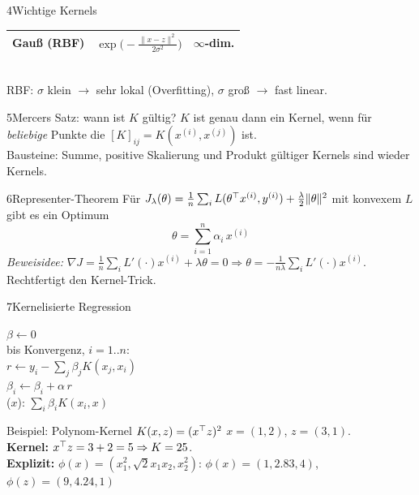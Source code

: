 \begin{hngrid}
\begin{hnp}[raster multicolumn=3,acc=hnnavy]{4}{Wichtige Kernels}
\begin{tabular}{@{}p{2.0cm}p{3.9cm}p{2.5cm}@{}}
Gauß (RBF)&$\exp\!\bigl(-\frac{\|x-z\|^2}{2\sigma^2}\bigr)$&$\infty$-dim.\\\hline
\end{tabular}
\\[2pt]
RBF: $\sigma$ klein $\to$ sehr lokal (Overfitting), $\sigma$ groß $\to$ fast linear.
\end{hnp}
%
\begin{hnp}[raster multicolumn=3,acc=hngreen]{5}{Mercers Satz: wann ist $K$ gültig?}
$K$ ist genau dann ein Kernel, wenn für \emph{beliebige} Punkte die  $[K]_{ij}=K(x^{(i)},x^{(j)})$  ist.\\
Bausteine: Summe, positive Skalierung und Produkt gültiger Kernels sind wieder Kernels.
\end{hnp}
%
\begin{hnp}[raster multicolumn=3,acc=hnrose]{6}{Representer-Theorem}
Für $J_\lambda(\theta)=\frac1n\sum_iL(\theta^{\top} x^{(i)},y^{(i)})+\frac\lambda2\|\theta\|^2$ mit konvexem $L$ gibt es ein Optimum
\[ \theta=\sum_{i=1}^{n}\alpha_i\,x^{(i)} \]
\emph{Beweisidee:} $\nabla J=\frac1n\sum_iL'(\cdot)x^{(i)}+\lambda\theta=0\Rightarrow\theta=-\frac1{n\lambda}\sum_iL'(\cdot)x^{(i)}$. Rechtfertigt den Kernel-Trick.
\end{hnp}
%
\begin{hnp}[raster multicolumn=3,acc=hnpurple]{7}{Kernelisierte Regression}
\begin{pcode}
 $\beta\leftarrow 0$\\
 bis Konvergenz,  $i=1..n$:\\
\hii $r\leftarrow y_i-\sum_j\beta_j K(x_j,x_i)$\\
\hii $\beta_i\leftarrow\beta_i+\alpha\, r$\\
($x$): $\sum_i\beta_i K(x_i,x)$\\
\end{pcode}
\end{hnp}
%
\begin{hnex}[raster multicolumn=4]{Beispiel: Polynom-Kernel $K(x,z)=(x^{\top} z)^2$}
$x=(1,2)$, $z=(3,1)$. \hnsol\\
\textbf{Kernel:} $x^{\top} z=3+2=5\Rightarrow K=25$.\\
\textbf{Explizit:} $\phi(x)=(x_1^2,\sqrt2x_1x_2,x_2^2)$: $\phi(x)=(1,2.83,4)$, $\phi(z)=(9,4.24,1)$\\

\end{hnex}
\end{hngrid}
